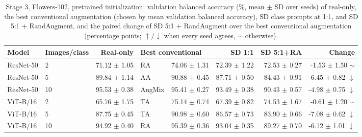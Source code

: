 \begin{table}[H]
\centering
\small
\setlength{\tabcolsep}{4pt}
\caption{Stage 3, Flowers-102, pretrained initialization: validation balanced accuracy (\%, mean $\pm$ SD over seeds) of real-only, the best conventional augmentation (chosen by mean validation balanced accuracy), SD class prompts at 1:1, and SD 5:1 + RandAugment, and the paired change of SD 5:1 + RandAugment over the best conventional augmentation (percentage points; $\uparrow$/$\downarrow$ when every seed agrees, $\sim$ otherwise).}
\label{tab:stage3-flowers102-scores-pretrained}
\begin{tabular}{llrlrrrr}
\toprule
Model & Images/class & Real-only & \multicolumn{2}{l}{Best conventional} & SD 1:1 & SD 5:1+RA & Change \\
\midrule
ResNet-50 & 2 & 71.12 $\pm$ 1.05 & RA & 74.06 $\pm$ 1.31 & 72.39 $\pm$ 1.22 & 72.53 $\pm$ 0.27 & -1.53 $\pm$ 1.50 $\sim$ \\
ResNet-50 & 5 & 89.84 $\pm$ 1.14 & AA & 90.88 $\pm$ 0.45 & 87.71 $\pm$ 0.50 & 84.43 $\pm$ 0.91 & -6.45 $\pm$ 0.82 $\downarrow$ \\
ResNet-50 & 10 & 95.53 $\pm$ 0.38 & AugMix & 95.41 $\pm$ 0.27 & 93.49 $\pm$ 0.38 & 90.43 $\pm$ 0.57 & -4.98 $\pm$ 0.75 $\downarrow$ \\
ViT-B/16 & 2 & 65.76 $\pm$ 1.75 & TA & 75.14 $\pm$ 0.74 & 67.39 $\pm$ 0.82 & 74.53 $\pm$ 1.67 & -0.61 $\pm$ 1.20 $\sim$ \\
ViT-B/16 & 5 & 87.75 $\pm$ 0.45 & TA & 90.98 $\pm$ 0.60 & 86.57 $\pm$ 0.73 & 83.90 $\pm$ 0.66 & -7.08 $\pm$ 0.62 $\downarrow$ \\
ViT-B/16 & 10 & 94.92 $\pm$ 0.40 & RA & 95.39 $\pm$ 0.36 & 93.04 $\pm$ 0.35 & 89.27 $\pm$ 0.70 & -6.12 $\pm$ 1.01 $\downarrow$ \\
\bottomrule
\end{tabular}
\end{table}
